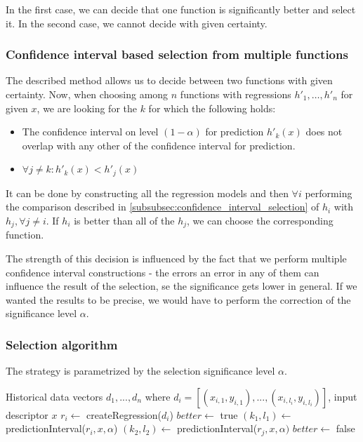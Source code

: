 In the first case, we can decide that one function is significantly better and select it. In the second case, we cannot decide with given certainty.

\subsubsection{Confidence interval based selection from multiple functions}

The described method allows us to decide between two functions with given certainty. Now, when choosing among $n$ functions with regressions $h'_1, \dots, h'_n$ for given $x$, we are looking for the $k$ for which the following holds:

\begin{itemize}
	\item The confidence interval on level $(1-\alpha)$ for prediction $h'_k(x)$ does not overlap with any other of the confidence interval for prediction.
	\item $\forall j \ne k: h'_k(x) < h'_j(x)$
\end{itemize}

It can be done by constructing all the regression models and then $\forall i$ performing the comparison described in \ref{subsubsec:confidence_interval_selection} of $h_i$ with $h_j, \forall j \ne i$. If $h_i$ is better than all of the $h_j$, we can choose the corresponding function.

The strength of this decision is influenced by the fact that we perform multiple confidence interval constructions - the errors an error in any of them can influence the result of the selection, se the significance gets lower in general. If we wanted the results to be precise, we would have to perform the correction of the significance level $\alpha$.


\subsubsection{Selection algorithm}

The strategy is parametrized by the selection significance level $\alpha$.

\begin{algorithmic}[1] %
	\INPUT Historical data vectors $d_1,...,d_n$ where $d_i = [(x_{i,1}, y_{i,1}),...,(x_{i,l_i}, y_{i,l_i})]$, input descriptor $x$
	\State $r_i \gets$ createRegression($d_i$) 
	\EndFor
	\State $better \gets$ true
	\State $(k_1, l_1) \gets$ predictionInterval($r_i, x, \alpha$)
	\State $(k_2, l_2) \gets$ predictionInterval($r_j, x, \alpha)$
	\State $better \gets$ false
	\EndIf
	\EndFor
	\State {}
	\EndIf
	\EndFor
	\State {}
\end{algorithmic}

